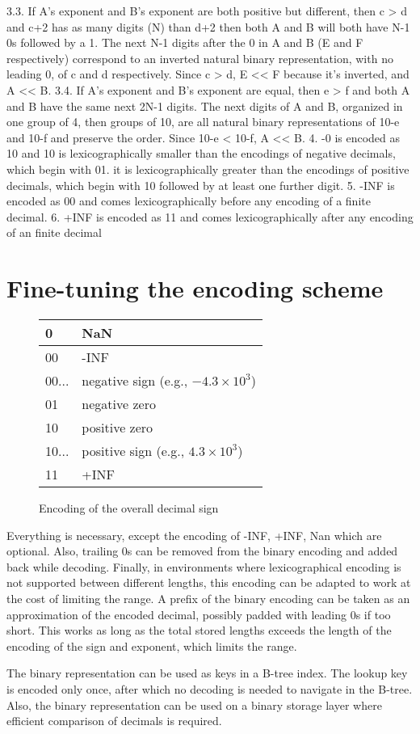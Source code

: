 \documentclass{acm_proc_article-sp}
\begin{document}
  3.3. If A's exponent and B's exponent are both positive but different, then c > d and c+2 has as many digits (N) than d+2 then both A and B will both have N-1 0s followed by a 1. The next N-1 digits after the 0 in A and B (E and F respectively) correspond to an inverted natural binary representation, with no leading 0, of c and d respectively. Since c > d, E << F because it's inverted, and A << B.
  3.4. If A's exponent and B's exponent are equal, then e > f and both A and B have the same next 2N-1 digits. The next digits of A and B, organized in one group of 4, then groups of 10, are all natural binary representations of 10-e and 10-f and preserve the order. Since 10-e < 10-f, A << B.
4. -0 is encoded as 10 and 10 is lexicographically smaller than the encodings of negative decimals, which begin with 01. it is lexicographically greater than the encodings of positive decimals, which begin with 10 followed by at least one further digit.
5. -INF is encoded as 00 and comes lexicographically before any encoding of a finite decimal.
6. +INF is encoded as 11 and comes lexicographically after any encoding of an finite decimal

\section{Fine-tuning the encoding scheme}

\begin{figure}
\caption{Encoding of the overall decimal sign}
\label{figure-sign-extended}
\center
\begin{tabular}{|l|l|}
\hline
0 & NaN \\
\hline
00 & -INF \\
\hline
00... &  negative sign (e.g., $-4.3\times10^3$)\\
\hline
01 & negative zero \\
\hline
10 & positive zero \\
\hline
10... & positive sign (e.g., $4.3\times10^3$)\\
\hline
11 & +INF \\
\hline
\end{tabular}
\end{figure}


Everything is necessary, except the encoding of -INF, +INF, Nan which are optional. Also, trailing 0s can be removed from the binary encoding and added back while decoding. Finally, in environments where lexicographical encoding is not supported between different lengths, this encoding can be adapted to work at the cost of limiting the range.
A prefix of the binary encoding can be taken as an approximation of the encoded decimal, possibly padded with leading 0s if too short. This works as long as the total stored lengths exceeds the length of the encoding of the sign and exponent, which limits the range.

The binary representation can be used as keys in a B-tree index. The lookup key is encoded only once, after which no decoding is needed to navigate in the B-tree.
Also, the binary representation can be used on a binary storage layer where efficient comparison of decimals is required.
\end{document}
